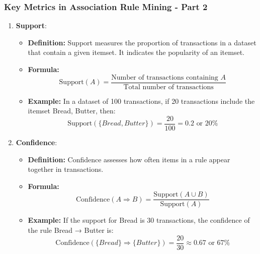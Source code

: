 \documentclass{beamer}
\begin{document}
\begin{frame}[fragile]
    \frametitle{Key Metrics in Association Rule Mining - Part 2}
    \begin{enumerate}
        \item \textbf{Support}:
        \begin{itemize}
            \item \textbf{Definition:} Support measures the proportion of transactions in a dataset that contain a given itemset. It indicates the popularity of an itemset.
            \item \textbf{Formula:}  
            \begin{equation}
                \text{Support}(A) = \frac{\text{Number of transactions containing } A}{\text{Total number of transactions}}
            \end{equation}
            \item \textbf{Example:} In a dataset of 100 transactions, if 20 transactions include the itemset {Bread, Butter}, then:
            \begin{equation}
                \text{Support}(\{Bread, Butter\}) = \frac{20}{100} = 0.2 \text{ or } 20\%
            \end{equation}
        \end{itemize}

        \item \textbf{Confidence}:
        \begin{itemize}
            \item \textbf{Definition:} Confidence assesses how often items in a rule appear together in transactions.
            \item \textbf{Formula:}  
            \begin{equation}
                \text{Confidence}(A \Rightarrow B) = \frac{\text{Support}(A \cup B)}{\text{Support}(A)}
            \end{equation}
            \item \textbf{Example:} If the support for {Bread} is 30 transactions, the confidence of the rule {Bread} → {Butter} is:
            \begin{equation}
                \text{Confidence}(\{Bread\} \Rightarrow \{Butter\}) = \frac{20}{30} \approx 0.67 \text{ or } 67\%
            \end{equation}
        \end{itemize}
    \end{enumerate}
\end{frame}
\end{document}
